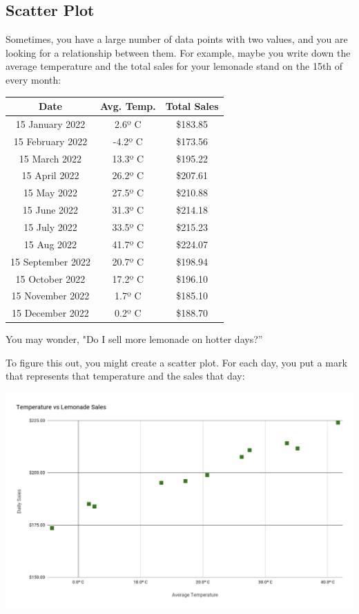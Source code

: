 \subsection{Scatter Plot}

Sometimes, you have a large number of data points with two values, and you are
looking for a relationship between them.  For example, maybe you write
down the average temperature and the total sales for your lemonade
stand on the 15th of every month:

\begin{tabular}{c | c | c}
  Date &	Avg. Temp. &	Total Sales \\
  \hline
15 January 2022 & 2.6º C & \$183.85 \\
15 February 2022 & -4.2º C & \$173.56\\
15 March 2022 & 13.3º C & \$195.22\\
15 April 2022 & 26.2º C & \$207.61\\
15 May 2022 & 27.5º C & \$210.88\\
15 June 2022 & 31.3º C & \$214.18\\
15 July 2022 & 33.5º C & \$215.23\\
15 Aug 2022 & 41.7º C & \$224.07\\
15 September 2022 & 20.7º C & \$198.94\\
15 October 2022 & 17.2º C & \$196.10\\
15 November 2022 & 1.7º C & \$185.10\\
15 December 2022 & 0.2º C & \$188.70 \\
\end{tabular}

You may wonder, "Do I sell more lemonade on hotter days?''

To figure this out, you might create a scatter plot.  For each day, you put a mark that
represents that temperature and the sales that day:

\includegraphics[width=\textwidth]{LemonadeScatter.png}

